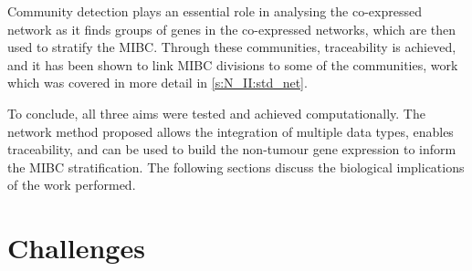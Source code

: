 Community detection plays an essential role in analysing the co-expressed network as it finds groups of genes in the co-expressed networks, which are then used to stratify the MIBC. Through these communities, traceability is achieved, and it has been shown to link MIBC divisions to some of the communities, work which was covered in more detail in \cref{s:N_II:std_net}.

% 
To conclude, all three aims were tested and achieved computationally. The network method proposed allows the integration of multiple data types, enables traceability, and can be used to build the non-tumour gene expression to inform the MIBC stratification. The following sections discuss the biological implications of the work performed.

\section{Challenges}




